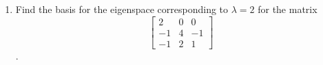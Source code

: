 \documentclass[titlepage]{article}
\begin{document}
\begin{enumerate}
	\item Find the basis for the eigenspace corresponding to \(\lambda = 2\) for the matrix \[\begin{bmatrix}2 & 0 & 0 \\ -1 & 4 & -1 \\ -1 & 2 & 1\end{bmatrix}\] \hfill \fbox{\phantom{\(\begin{bmatrix}0 & 0 & 0 \\ 0 & 0 & 0 \\ 0 & 0 & 0\end{bmatrix}\)}}.
\end{enumerate}
\newpage

\end{document}
